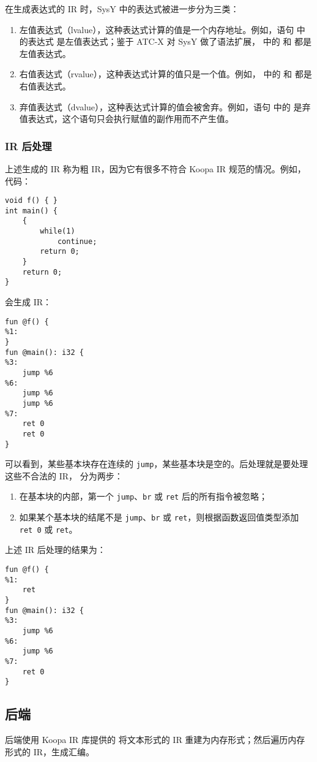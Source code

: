 在生成表达式的 IR 时，SysY 中的表达式被进一步分为三类：
\begin{enumerate}
    \item 左值表达式（lvalue），这种表达式计算的值是一个内存地址。例如，语句  中的表达式  是左值表达式；鉴于 ATC-X 对 SysY 做了语法扩展， 中的 和  都是左值表达式。
    \item 右值表达式（rvalue），这种表达式计算的值只是一个值。例如， 中的  和  都是右值表达式。
    \item 弃值表达式（dvalue），这种表达式计算的值会被舍弃。例如，语句  中的  是弃值表达式，这个语句只会执行赋值的副作用而不产生值。
\end{enumerate}
\subsubsection{IR 后处理}
上述生成的 IR 称为粗 IR，因为它有很多不符合 Koopa IR 规范的情况。例如，代码：
\begin{verbatim}
void f() { }
int main() {
    {
        while(1)
            continue;
        return 0;
    }
    return 0;
}
\end{verbatim}
会生成 IR：
\begin{verbatim}
fun @f() {
%1:
}
fun @main(): i32 {
%3:
    jump %6
%6:
    jump %6
    jump %6
%7:
    ret 0
    ret 0
}
\end{verbatim}
可以看到，某些基本块存在连续的 \texttt{jump}，某些基本块是空的。后处理就是要处理这些不合法的 IR，
分为两步：
\begin{enumerate}
    \item 在基本块的内部，第一个 \texttt{jump}、\texttt{br} 或 \texttt{ret} 后的所有指令被忽略；
    \item 如果某个基本块的结尾不是 \texttt{jump}、\texttt{br} 或 \texttt{ret}，则根据函数返回值类型添加 \texttt{ret 0} 或 \texttt{ret}。
\end{enumerate}
上述 IR 后处理的结果为：
\begin{verbatim}
fun @f() {
%1:
    ret
}
fun @main(): i32 {
%3:
    jump %6
%6:
    jump %6
%7:
    ret 0
}
\end{verbatim}
\subsection{后端}
后端使用 Koopa IR 库提供的  将文本形式的 IR 重建为内存形式；然后遍历内存形式的 IR，生成汇编。
